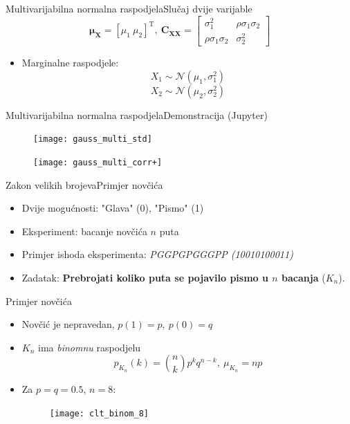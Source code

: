 \documentclass[aspectratio=169]{beamer}
\begin{document}
  \begin{frame}{Multivarijabilna normalna raspodjela}{Slučaj dvije varijable}
    $$ \bm\mu_{\bm X} = [\mu_1\ \mu_2]^\mathrm T,\ 
      \bm C_{\bm X\bm X} = \left[\begin{array}{cc}
        \sigma_1^2 & \rho\sigma_1\sigma_2 \\  \rho\sigma_1\sigma_2 & \sigma_2^2
        \end{array}\right] $$
    \begin{itemize}
      \item Marginalne raspodjele:
        $$X_1 \sim \mathcal{N}(\mu_1, \sigma_1^2)$$
        $$X_2 \sim \mathcal{N}(\mu_2, \sigma_2^2)$$
    \end{itemize}
  \end{frame}

  \begin{frame}{Multivarijabilna normalna raspodjela}{Demonstracija (Jupyter)}
    \begin{figure}[ht]
      \begin{minipage}[b]{0.45\linewidth}
        \centering
        \texttt{[image: gauss\_multi\_std]}
      \end{minipage}
      \begin{minipage}[b]{0.45\linewidth}
        \centering
        \texttt{[image: gauss\_multi\_corr+]}
      \end{minipage}
    \end{figure}
  \end{frame}
  
  \begin{frame}{Zakon velikih brojeva}{Primjer novčića}
    \begin{itemize}
      \item Dvije mogućnosti: "Glava" (0), "Pismo" (1)
      \item Eksperiment: bacanje novčića $n$ puta
      \item Primjer ishoda eksperimenta: \textit{PGGPGPGGGPP (10010100011)}
      \item Zadatak: \textbf{Prebrojati koliko puta se pojavilo pismo u $n$
        bacanja} ($K_n$).
    \end{itemize}
  \end{frame}

  \begin{frame}{Primjer novčića}
    \begin{itemize}
      \item Novčić je nepravedan, $p(1)=p,\ p(0)=q$
      \item $K_n$ ima \textit{binomnu} raspodjelu
        $$p_{K_n}(k) = \binom{n}{k}p^kq^{n-k},\ \mu_{K_n}=np$$
      \item Za $p=q=0.5$, $n=8$:
      \begin{figure}
        \centering
        \texttt{[image: clt\_binom\_8]}
      \end{figure}
    \end{itemize}
  \end{frame}
  
\end{document}

